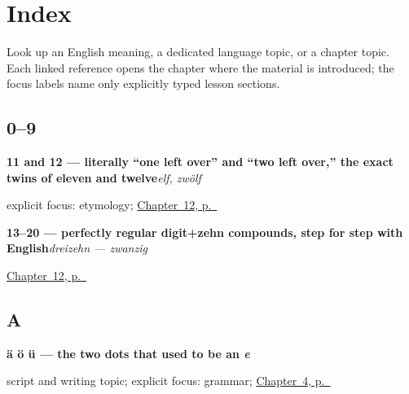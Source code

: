 
\chapter*{Index}

Look up an English meaning, a dedicated language topic, or a chapter topic. Each linked reference opens the chapter where the material is introduced; the focus labels name only explicitly typed lesson sections.

\section*{0--9}

\noindent\begin{minipage}[t]{\linewidth}
\raggedright
\textbf{11 and 12 — literally \textquotedblleft{}one left over\textquotedblright{} and \textquotedblleft{}two left over,\textquotedblright{} the exact twins of eleven and twelve}\enspace\emph{elf, zwölf}\par
\footnotesize explicit focus: etymology; \hyperref[ch:numbers-11-20]{Chapter~12, p.~\pageref*{ch:numbers-11-20}}
\end{minipage}\par\smallskip

\noindent\begin{minipage}[t]{\linewidth}
\raggedright
\textbf{13–20 — perfectly regular digit+zehn compounds, step for step with English}\enspace\emph{dreizehn — zwanzig}\par
\footnotesize \hyperref[ch:numbers-11-20]{Chapter~12, p.~\pageref*{ch:numbers-11-20}}
\end{minipage}\par\smallskip

\section*{A}

\noindent\begin{minipage}[t]{\linewidth}
\raggedright
\textbf{ä ö ü — the two dots that used to be an \emph{e}}\par
\footnotesize script and writing topic; explicit focus: grammar; \hyperref[ch:farewells]{Chapter~4, p.~\pageref*{ch:farewells}}
\end{minipage}\par\smallskip

